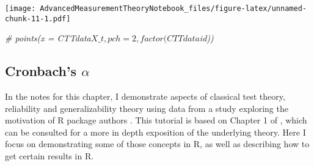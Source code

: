 \documentclass[
]{book}
\newenvironment{Shaded}{\begin{snugshade}}{\end{snugshade}}
\newcommand{\AttributeTok}[1]{\textcolor[rgb]{0.77,0.63,0.00}{#1}}
\newcommand{\CommentTok}[1]{\textcolor[rgb]{0.56,0.35,0.01}{\textit{#1}}}
\newcommand{\DecValTok}[1]{\textcolor[rgb]{0.00,0.00,0.81}{#1}}
\newcommand{\FunctionTok}[1]{\textcolor[rgb]{0.00,0.00,0.00}{#1}}
\newcommand{\NormalTok}[1]{#1}
\newcommand{\SpecialCharTok}[1]{\textcolor[rgb]{0.00,0.00,0.00}{#1}}
\newcommand{\StringTok}[1]{\textcolor[rgb]{0.31,0.60,0.02}{#1}}
\begin{document}
\begin{Shaded}
\end{Shaded}

\texttt{[image: AdvancedMeasurementTheoryNotebook\_files/figure-latex/unnamed-chunk-11-1.pdf]}

\begin{Shaded}
\begin{Highlighting}[]
\CommentTok{\# points(x = CTTdata$X\_t, pch = 2, factor(CTTdata$id))}
\end{Highlighting}
\end{Shaded}

\hypertarget{cronbachs-alpha}{%
\subsection{\texorpdfstring{Cronbach's \(\alpha\)}{Cronbach's \textbackslash alpha}}\label{cronbachs-alpha}}

In the notes for this chapter, I demonstrate aspects of classical test theory, reliability and generalizability theory using data from a study exploring the motivation of R package authors \citep{mair2015motivation}.
This tutorial is based on Chapter 1 of \citet{mair2018modern}, which can be consulted for a more in depth exposition of the underlying theory.
Here I focus on demonstrating some of those concepts in R, as well as describing how to get certain results in R.
\end{document}
